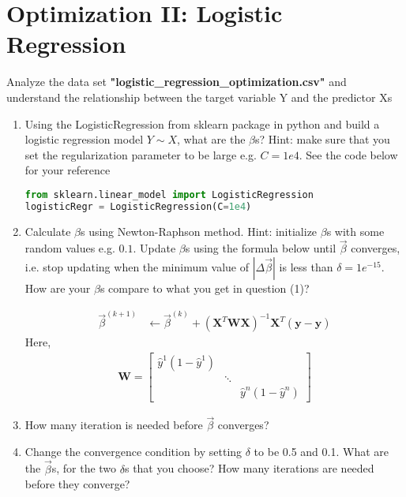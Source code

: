 \documentclass{article}
\begin{document}
\section{Optimization II: Logistic Regression} %
Analyze the data set \textbf{"logistic\_regression\_optimization.csv"} and understand the relationship between the target variable Y and the predictor Xs

\begin{enumerate}[(1)]
\item Using the LogisticRegression from sklearn package in python and build a logistic regression model $Y\sim X$, what are the $\beta$s? Hint: make sure that you set the regularization parameter to be large e.g. $C=1e4$. See the code below for your reference
\begin{lstlisting}[language=Python]
from sklearn.linear_model import LogisticRegression
logisticRegr = LogisticRegression(C=1e4)
\end{lstlisting}

\item Calculate $\beta$s using Newton-Raphson method. Hint: initialize $\beta$s with some random values e.g. $0.1$. Update $\beta$s using the formula below until $\vec{\beta}$ converges, i.e. stop updating when the minimum value of $|\Delta \vec{\beta}|$ is less than $\delta=1e^{-15}$. How are your $\beta$s compare to what you get in question (1)?

\begin{align*}
\vec{\beta}^{(k+1)} &\leftarrow \vec{\beta}^{(k)}+(\textbf{X}^T\textbf{W}\textbf{X})^{-1}\textbf{X}^T(\textbf{y}-\hat{\textbf{y}})
\end{align*}
Here,
\begin{align*}
\textbf{W}=  \begin{bmatrix}
    \hat{y}^1 (1-\hat{y}^1) & & \\
    & \ddots & \\
    & & \hat{y}^n (1-\hat{y}^n)
  \end{bmatrix}
\end{align*}

\item How many iteration is needed before  $\vec{\beta}$ converges?

\item Change the convergence condition by setting $\delta$ to be 0.5 and 0.1. What are the $\vec{\beta}$s, for the two $\delta$s that you choose? How many iterations are needed before they converge?
\end{enumerate}
\end{document}
